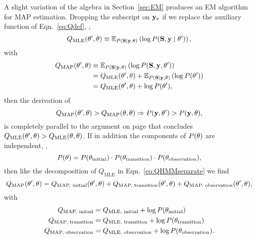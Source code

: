 A slight variation of the algebra in Section~\ref{sec:EM} produces an
EM algorithm for MAP estimation.  Dropping the subscript on $\mathbf{y}_e$ if
we replace the auxiliary function of Eqn.~\eqref{eq:Qdef}, \ie,
\begin{equation*}
  Q_{\text{MLE}}(\theta',\theta) \equiv \mathbb{E}_{P
    \left({\bf S}\mid \mathbf{y},\theta \right)} \left( \log P({\bf S},\mathbf{y}\mid \theta') \right),
\end{equation*}
with
\begin{subequations}
  \label{eq:QMAP}
  \begin{align}
  \label{eq:QMAPa}
    Q_{\text{MAP}}(\theta',\theta) &\equiv \mathbb{E}_{P \left({\bf S}\mid \mathbf{y},\theta \right)}
    \left( \log P({\bf S},\mathbf{y},\theta') \right) \\
  \label{eq:QMAPb}
    &= Q_{\text{MLE}}(\theta',\theta) + \mathbb{E}_{P \left({\bf S}\mid \mathbf{y},\theta
      \right)} \left( \log P(\theta')\right) \\
  \label{eq:QMAPc}
    &= Q_{\text{MLE}}(\theta',\theta) + \log P(\theta'),
  \end{align} 
\end{subequations}
then the derivation of
\begin{equation*}
    Q_{\text{MAP}}(\theta',\theta) > Q_{\text{MAP}}(\theta,\theta)
    \Rightarrow P(\mathbf{y},\theta') > P(\mathbf{y},\theta),
\end{equation*}
is completely parallel to the argument on page \pageref{eq:GEMcond}
that concludes $Q_{\text{MLE}}(\theta',\theta) >
Q_{\text{MLE}}(\theta,\theta)$.  If in addition the
components of $P(\theta)$ are independent, \ie,
\begin{equation*}
  P(\theta) = P(\theta_{\text{initial}}) \cdot
  P(\theta_{\text{transition}}) \cdot P(\theta_{\text{observation}}),
\end{equation*}
then like the decomposition of $Q_{\text{MLE}}$ in
Eqn.~\eqref{eq:QHMMseparate} we find
\begin{equation*}
  Q_{\text{MAP}}(\theta',\theta) =  Q_{\text{MAP, initial}}
  (\theta',\theta) +   Q_{\text{MAP, transition}} (\theta',\theta)
  + Q_{\text{MAP, observation}}
  (\theta',\theta),
\end{equation*}
with
\begin{subequations}
  \label{eq:QseparateMAP}
  \begin{align}
    Q_{\text{MAP, initial}} &= Q_{\text{MLE, initial}} + \log
    P(\theta_{\text{initial}}) \\
    Q_{\text{MAP, transition}} &= Q_{\text{MLE, transition}} + \log
    P(\theta_{\text{transition}}) \\
    \label{eq:QseparateMAPout}
    Q_{\text{MAP, observation}} &= Q_{\text{MLE, observation}} + \log
    P(\theta_{\text{observation}}).
  \end{align}
\end{subequations}
